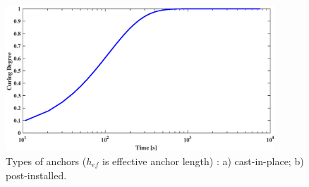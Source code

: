 \begin{figure}[h!]
	\centering
	\includegraphics[width=0.9\textwidth]{obrazky/CD-t.eps}
	\caption[Types of anchors]{Types of anchors ($h_{ef}$ is effective anchor length) \cite{anchors-ACI-318M}: a) cast-in-place; b) post-installed.}\label{obr:Curing_curing}
\end{figure}
